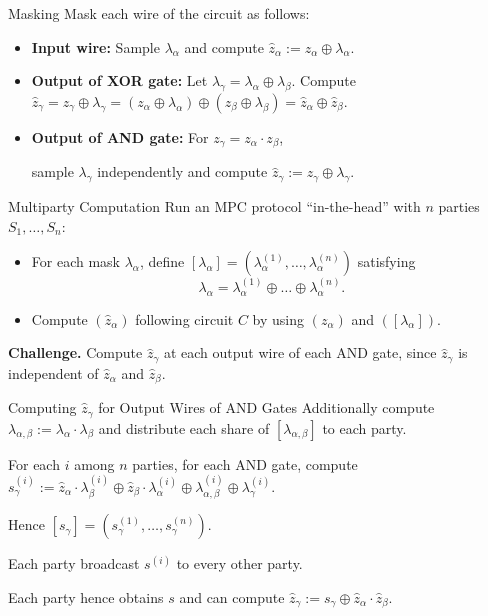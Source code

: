 \documentclass{beamer}
\begin{document}
	\begin{frame}{Masking}
		Mask each wire of the circuit as follows:
		\begin{itemize}
			\item \textbf{Input wire:} Sample $\lambda_\alpha$ and compute $\hat{z}_\alpha := z_\alpha \oplus \lambda_\alpha$.
			\item \textbf{Output of XOR gate:} Let $\lambda_\gamma = \lambda_\alpha \oplus \lambda_\beta$. Compute $\hat{z}_\gamma = z_\gamma \oplus \lambda_\gamma = (z_\alpha \oplus \lambda_\alpha) \oplus (z_\beta \oplus \lambda_\beta) =\hat{z}_\alpha \oplus \hat{z}_\beta$.
			\item \textbf{Output of AND gate:} For $z_\gamma = z_\alpha \cdot z_\beta$, 
			
			sample $\lambda_\gamma$ independently and compute $\hat{z}_\gamma := z_\gamma \oplus \lambda_\gamma$.
		\end{itemize}
	\end{frame}

	\begin{frame}{Multiparty Computation}
		Run an MPC protocol ``in-the-head'' with $n$ parties $S_1, \dots, S_n$:
		\begin{itemize}
			\item For each mask $\lambda_\alpha$, define $[\lambda_\alpha] = (\lambda_\alpha^{(1)}, \dots, \lambda_\alpha^{(n)})$ satisfying 
			\begin{equation*}
				\lambda_\alpha = \lambda_\alpha^{(1)} \oplus \dots\oplus \lambda_\alpha^{(n)}.
			\end{equation*}
			\item Compute $\left(\hat{z}_\alpha\right)$ following circuit $C$ by using $\left(z_\alpha\right)$ and $\left([\lambda_\alpha]\right)$.
		\end{itemize}
		\textbf{Challenge.} Compute $\hat{z}_\gamma$ at each output wire of each AND gate, since $\hat{z}_\gamma$ is independent of $\hat{z}_\alpha$ and $\hat{z}_\beta$.
	\end{frame}

	\begin{frame}{Computing $\hat{z}_\gamma$ for Output Wires of AND Gates}
		Additionally compute $\lambda_{\alpha,\beta} := \lambda_\alpha \cdot \lambda_\beta$ and distribute each share of $[\lambda_{\alpha,\beta}]$ to each party.
		
		For each $i$ among $n$ parties, for each AND gate, compute $s^{(i)}_\gamma := \hat{z}_\alpha \cdot\lambda_\beta^{(i)}  \oplus \hat{z}_\beta\cdot\lambda_\alpha^{(i)}  \oplus \lambda_{\alpha,\beta}^{(i)}  \oplus \lambda_\gamma^{(i)} $.
		
		Hence $[s_\gamma] = (s^{(1)}_\gamma, \dots, s^{(n)}_\gamma)$. 
		
		Each party broadcast $s^{(i)}$ to every other party. 
		
		Each party hence obtains $s$ and can compute $\hat{z}_\gamma := s_\gamma \oplus \hat{z}_\alpha \cdot \hat{z}_\beta$.
	\end{frame}
\end{document}
